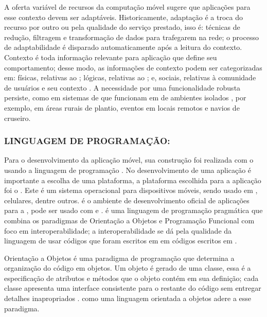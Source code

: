 A oferta variável de recursos da computação móvel sugere que aplicações para esse contexto devem ser adaptáveis. Historicamente, adaptação é a troca do recurso por outro ou pela qualidade do serviço prestado, isso é: técnicas de redução, filtragem e transformação de dados para trafegarem na rede; o processo de adaptabilidade é disparado automaticamente após a leitura do contexto. Contexto é toda informação relevante para aplicação que define seu comportamento; desse modo, as informações de contexto podem ser categorizadas em: físicas, relativas ao ; lógicas, relativas ao ; e, sociais, relativas à comunidade de usuários e seu contexto \cite{AugustinYaminGeyerBarbosa2001RequisitosAplicacoesMoveisDistribuidas}. A necessidade por uma funcionalidade  robusta persiste, como em sistemas de  que funcionam em  de ambientes isolados \cite{Guda2025OfflineFirstAndroidChat}, por exemplo, em áreas rurais de plantio, eventos em locais remotos e navios de cruseiro.

\subsubsection{LINGUAGEM DE PROGRAMAÇÃO: }

Para o desenvolvimento da aplicação móvel, sua construção foi realizada com o   usando a linguagem de programação . No desenvolvimento de uma aplicação é importante a escolha de uma plataforma, a plataforma escolhida para a aplicação foi o . Este é um sistema operacional para dispositivos móveis, sendo usado em , celulares, dentre outros.  é o ambiente de desenvolvimento oficial de aplicações para a , pode ser usado com   e .  é uma linguagem de programação pragmática que combina os paradigmas de Orientação a Objetos e Programação Funcional com foco em interoperabilidade; a interoperabilidade se dá pela qualidade da linguagem de usar códigos que foram escritos em  em códigos escritos em  \cite{Resende2020KotlinAndroid}. 

Orientação a Objetos é uma paradigma de programação que determina a organização do código em objetos. Um objeto é gerado de uma classe, essa é a especificação de atributos e métodos que o objeto contém em sua definição; cada classe apresenta uma interface consistente para o restante do código sem entregar detalhes inapropriados \cite{GoodrichTamassiaMount2011DataStructuresCpp}.  como uma linguagem orientada a objetos adere a esse paradigma.

